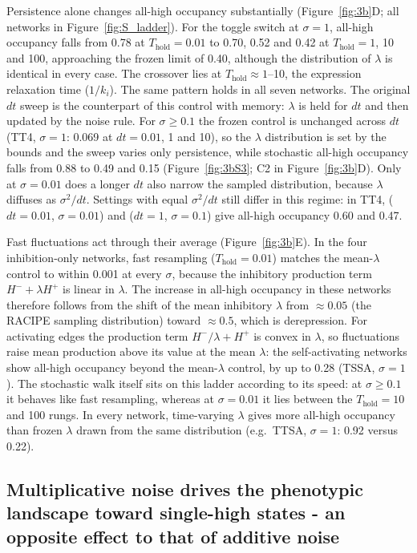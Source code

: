 \documentclass[11pt]{article}
\begin{document}
Persistence alone changes all-high occupancy substantially (Figure~\ref{fig:3b}D; all networks in Figure~\ref{fig:S_ladder}). For the toggle switch at $\sigma = 1$, all-high occupancy falls from 0.78 at $T_\text{hold} = 0.01$ to 0.70, 0.52 and 0.42 at $T_\text{hold} = 1$, 10 and 100, approaching the frozen limit of 0.40, although the distribution of $\lambda$ is identical in every case. The crossover lies at $T_\text{hold} \approx 1$--10, the expression relaxation time ($1/k_i$). The same pattern holds in all seven networks. The original $dt$ sweep is the counterpart of this control with memory: $\lambda$ is held for $dt$ and then updated by the noise rule. For $\sigma \geq 0.1$ the frozen control is unchanged across $dt$ (TT4, $\sigma = 1$: 0.069 at $dt = 0.01$, 1 and 10), so the $\lambda$ distribution is set by the bounds and the sweep varies only persistence, while stochastic all-high occupancy falls from 0.88 to 0.49 and 0.15 (Figure~\ref{fig:3bS3}; C2 in Figure~\ref{fig:3b}D). Only at $\sigma = 0.01$ does a longer $dt$ also narrow the sampled distribution, because $\lambda$ diffuses as $\sigma^2/dt$. Settings with equal $\sigma^2/dt$ still differ in this regime: in TT4, ($dt = 0.01$, $\sigma = 0.01$) and ($dt = 1$, $\sigma = 0.1$) give all-high occupancy 0.60 and 0.47.

Fast fluctuations act through their average (Figure~\ref{fig:3b}E). In the four inhibition-only networks, fast resampling ($T_\text{hold} = 0.01$) matches the mean-$\lambda$ control to within 0.001 at every $\sigma$, because the inhibitory production term $H^- + \lambda H^+$ is linear in $\lambda$. The increase in all-high occupancy in these networks therefore follows from the shift of the mean inhibitory $\lambda$ from $\approx 0.05$ (the RACIPE sampling distribution) toward $\approx 0.5$, which is derepression. For activating edges the production term $H^-/\lambda + H^+$ is convex in $\lambda$, so fluctuations raise mean production above its value at the mean $\lambda$: the self-activating networks show all-high occupancy beyond the mean-$\lambda$ control, by up to 0.28 (TSSA, $\sigma = 1$). The stochastic walk itself sits on this ladder according to its speed: at $\sigma \geq 0.1$ it behaves like fast resampling, whereas at $\sigma = 0.01$ it lies between the $T_\text{hold} = 10$ and 100 rungs. In every network, time-varying $\lambda$ gives more all-high occupancy than frozen $\lambda$ drawn from the same distribution (e.g.\ TTSA, $\sigma = 1$: 0.92 versus 0.22).

\subsection{Multiplicative noise drives the phenotypic landscape toward single-high states - an opposite effect to that of additive noise}
\end{document}
